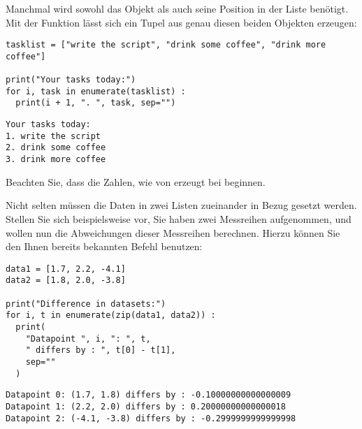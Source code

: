 \begin{hintbox}
Manchmal wird sowohl das Objekt als auch seine Position in der Liste benötigt. Mit der Funktion  lässt sich ein Tupel aus genau diesen beiden Objekten erzeugen:

\begin{codebox}
\begin{verbatim}
tasklist = ["write the script", "drink some coffee", "drink more coffee"]

print("Your tasks today:")
for i, task in enumerate(tasklist) :
  print(i + 1, ". ", task, sep="")
\end{verbatim}
\end{codebox}

\begin{cmdbox}
\begin{verbatim}
Your tasks today:
1. write the script
2. drink some coffee
3. drink more coffee
\end{verbatim}
\end{cmdbox}

Beachten Sie, dass die Zahlen, wie von  erzeugt bei  beginnen.
\end{hintbox}

\begin{hintbox}
Nicht selten müssen die Daten in zwei Listen zueinander in Bezug gesetzt werden. Stellen Sie sich beispielsweise vor, Sie haben zwei Messreihen aufgenommen, und wollen nun die Abweichungen dieser Messreihen berechnen. Hierzu können Sie den Ihnen bereits bekannten Befehl  benutzen:

\begin{codebox}
\begin{verbatim}
data1 = [1.7, 2.2, -4.1]
data2 = [1.8, 2.0, -3.8]

print("Difference in datasets:")
for i, t in enumerate(zip(data1, data2)) :
  print(
    "Datapoint ", i, ": ", t, 
    " differs by : ", t[0] - t[1], 
    sep=""
  )
\end{verbatim}
\end{codebox}

\begin{cmdbox}
\begin{verbatim}
Datapoint 0: (1.7, 1.8) differs by : -0.10000000000000009
Datapoint 1: (2.2, 2.0) differs by : 0.20000000000000018
Datapoint 2: (-4.1, -3.8) differs by : -0.2999999999999998
\end{verbatim}
\end{cmdbox}
\end{hintbox}

